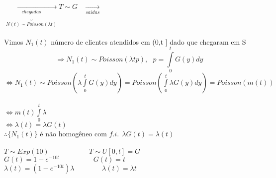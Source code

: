 \documentclass[a4paper,12pt]{article}
\begin{document}
$\underbrace{\underset{chegadas}{\longrightarrow}}_{N(t)\sim Poisson(\lambda t)}T\sim G\ \ \ \ \underset{saidas}{\longrightarrow}$\\
\\
Vimos $N_1(t)$ número de clientes atendidos em (0,t ] dado que chegaram em S 
$$\Rightarrow N_1(t)\sim Poisson(\lambda tp), \ \ \ p=\int\limits_{0}^{t}G(y)dy $$
$\Leftrightarrow N_1(t)\sim Poisson(\lambda\int\limits_{0}^{t}G(y)dy)=Poisson(\int\limits_{0}^{t}\lambda G(y)dy)=Poisson(m(t))$\\
\\
$\Leftrightarrow m(t)\int\limits_{0}^{t}\lambda$\\
$\Leftrightarrow \lambda(t)=\lambda G(t)$\\
$\therefore \{N_1(t)\}$ é não homogêneo com $f.i.\ \ \lambda G(t)=\lambda(t)$\\
\\
$T\sim Exp(10) \ \ \ \ \ \ \ \ \ \ \ \ \ \ \ \ \ \ \ \ \ \ \ \ \ \ T\sim U [0,t]=G$\\
$G(t)=1-e^{-10t} \ \ \ \ \ \ \ \ \ \ \ \ \ \ \ \ \ \ \ \ \ \  G(t)=t$\\
$\lambda(t)=(1-e^{-10t})\lambda \ \ \ \ \ \ \ \ \ \ \ \ \ \ \ \ \ \ \lambda(t)=\lambda t$\\
\newpage
\end{document}
